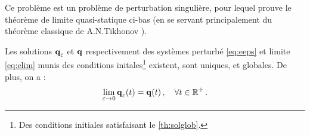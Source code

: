 Ce problème est un problème de perturbation singulière, pour lequel \citeauthor{balasoiu2020halthesis} prouve le théorème de limite quasi-statique ci-bas (en se servant principalement du théorème classique de A.N.Tikhonov \parencite{tikhonov1952systems,hoppensteadt1966singular}).
\begin{theorem}
    Les solutions $ \bm{\mathrm{q}}_\varepsilon$ et $\bm{\mathrm{q}}$ respectivement des systèmes perturbé \cref{eq:eeps} et limite \cref{eq:elim} munis des conditions initales\footnote{Des conditions initiales satisfaisant le \cref{th:solglob}.} existent, sont uniques, et globales.
    De plus, on a :
    $$
    \lim_{\varepsilon \rightarrow 0} \bm{\mathrm{q}}_{\varepsilon}(t) = \bm{\mathrm{q}}(t) \,, \quad \forall t \in \mathbb{R}^+ \,.
    $$
\end{theorem}

